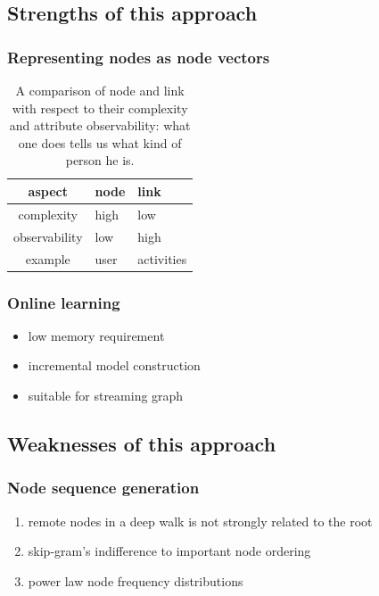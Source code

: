 \documentclass{article}
\begin{document}
\subsection{Strengths of this approach}

\subsubsection{Representing nodes as node vectors}
\begin{table}[H]
	\centering
	\begin{tabularx}{0.5\textwidth}{ |c|X|X| } \hline
		aspect  & node & link \\ \hline
		complexity & high & low \\ \hline
		observability & low & high \\ \hline
		example & user & activities \\ \hline
	\end{tabularx}
	\caption{A comparison of node and link with respect to their complexity and attribute observability: what one does tells us what kind of person he is.}
	\label{tab:nodesVSlinks}
\end{table}

\subsubsection{Online learning}
\begin{itemize}
	\item low memory requirement
	\item incremental model construction
	\item suitable for streaming graph
\end{itemize}

\subsection{Weaknesses of this approach}

\subsubsection{Node sequence generation}
\begin{enumerate}
	\item remote nodes in a deep walk is not strongly related to the root
	\item skip-gram's indifference to important node ordering
	\item power law node frequency distributions
\end{enumerate}
\end{document}
